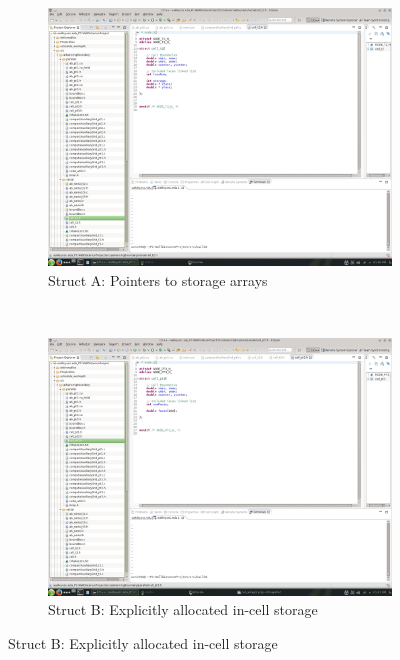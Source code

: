 \documentclass[]{aiaa-tc}%
\begin{document}
\begin{figure}
  \begin{subfigure}[b]{0.45\linewidth}
    \centering
    \includegraphics[trim=11.2cm 21.8cm 24cm 4.8cm,
    clip=true, width=0.7\linewidth]{figures/cells/cell_pointers}
    \caption{Struct A: Pointers to storage arrays}
  \end{subfigure}
  ~
  \begin{subfigure}[b]{0.45\linewidth}
    \centering
    \includegraphics[trim=11.2cm 21.8cm 24cm 4.8cm,
    clip=true, width=0.7\linewidth]{figures/cells/cell_array}
    \caption{Struct B: Explicitly allocated in-cell storage}
  \end{subfigure}
  

\end{figure}
\end{document}
